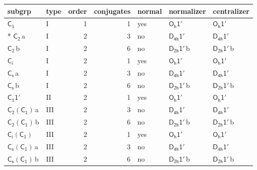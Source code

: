 \documentclass[10pt,a4paper]{article}
\numberwithin{equation}{section}
\newcommand{\grp}[1]{\mathsf{#1}}
\newcommand{\clsletter}[1]{\,{\scriptsize\color{black!55}#1}}
\begin{document}
{\small\begin{longtable}{@{}llrrlll@{}}\toprule
subgrp & type & order & conjugates & normal & normalizer & centralizer\\\midrule\endhead
\bottomrule\endfoot\endlastfoot
\href{../../../rotation/data/pdf/C1.pdf}{$\grp{C_{1}}$} & I & 1 & 1 & yes & \href{Oh-1p.pdf}{$\grp{O_{h}1'}$} & \href{Oh-1p.pdf}{$\grp{O_{h}1'}$}\\*
\href{../../../rotation/data/pdf/C2.pdf}{$\grp{C_{2}}$}\clsletter{a} & I & 2 & 3 & no & \href{D4h-1p.pdf}{$\grp{D_{4h}1'}$} & \href{D4h-1p.pdf}{$\grp{D_{4h}1'}$}\\
\href{../../../rotation/data/pdf/C2.pdf}{$\grp{C_{2}}$}\clsletter{b} & I & 2 & 6 & no & \href{D2h-1p.pdf}{$\grp{D_{2h}1'}$}\clsletter{b} & \href{D2h-1p.pdf}{$\grp{D_{2h}1'}$}\clsletter{b}\\
\href{../../../rotation/data/pdf/S2.pdf}{$\grp{C_{i}}$} & I & 2 & 1 & yes & \href{Oh-1p.pdf}{$\grp{O_{h}1'}$} & \href{Oh-1p.pdf}{$\grp{O_{h}1'}$}\\
\href{../../../rotation/data/pdf/C1v.pdf}{$\grp{C_{s}}$}\clsletter{a} & I & 2 & 3 & no & \href{D4h-1p.pdf}{$\grp{D_{4h}1'}$} & \href{D4h-1p.pdf}{$\grp{D_{4h}1'}$}\\
\href{../../../rotation/data/pdf/C1v.pdf}{$\grp{C_{s}}$}\clsletter{b} & I & 2 & 6 & no & \href{D2h-1p.pdf}{$\grp{D_{2h}1'}$}\clsletter{b} & \href{D2h-1p.pdf}{$\grp{D_{2h}1'}$}\clsletter{b}\\
\href{C1-1p.pdf}{$\grp{C_{1}1'}$} & II & 2 & 1 & yes & \href{Oh-1p.pdf}{$\grp{O_{h}1'}$} & \href{Oh-1p.pdf}{$\grp{O_{h}1'}$}\\
\href{C2-C1.pdf}{$\grp{C_{2}}(\grp{C_{1}})$}\clsletter{a} & III & 2 & 3 & no & \href{D4h-1p.pdf}{$\grp{D_{4h}1'}$} & \href{D4h-1p.pdf}{$\grp{D_{4h}1'}$}\\
\href{C2-C1.pdf}{$\grp{C_{2}}(\grp{C_{1}})$}\clsletter{b} & III & 2 & 6 & no & \href{D2h-1p.pdf}{$\grp{D_{2h}1'}$}\clsletter{b} & \href{D2h-1p.pdf}{$\grp{D_{2h}1'}$}\clsletter{b}\\
\href{S2-C1.pdf}{$\grp{C_{i}}(\grp{C_{1}})$} & III & 2 & 1 & yes & \href{Oh-1p.pdf}{$\grp{O_{h}1'}$} & \href{Oh-1p.pdf}{$\grp{O_{h}1'}$}\\
\href{C1v-C1.pdf}{$\grp{C_{s}}(\grp{C_{1}})$}\clsletter{a} & III & 2 & 3 & no & \href{D4h-1p.pdf}{$\grp{D_{4h}1'}$} & \href{D4h-1p.pdf}{$\grp{D_{4h}1'}$}\\
\href{C1v-C1.pdf}{$\grp{C_{s}}(\grp{C_{1}})$}\clsletter{b} & III & 2 & 6 & no & \href{D2h-1p.pdf}{$\grp{D_{2h}1'}$}\clsletter{b} & \href{D2h-1p.pdf}{$\grp{D_{2h}1'}$}\clsletter{b}\\

\end{longtable}}
\end{document}
